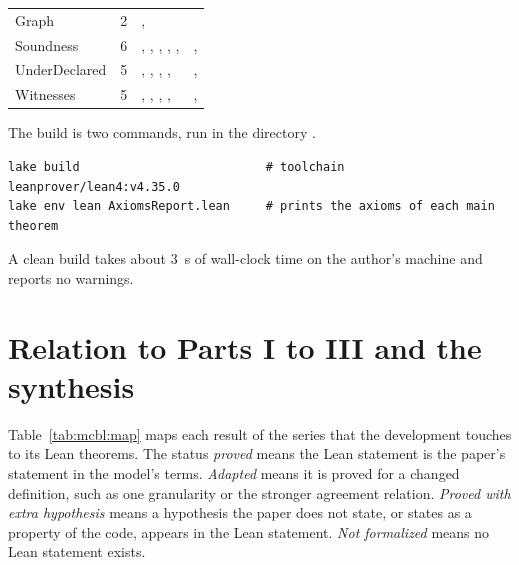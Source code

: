 \documentclass[11pt,letterpaper]{article}
\theoremstyle{definition}
\theoremstyle{remark}
\begin{document}
\begin{small}
\begin{longtable}{@{}L{2.3cm}L{1.0cm}L{8.7cm}L{2.4cm}@{}}
Graph & 2 & ,  &  \\
Soundness & 6 & , , , , ,  & ,  \\
UnderDeclared & 5 & , , , ,  & ,  \\
Witnesses & 5 & , , , ,  & ,  \\
\end{longtable}
\end{small}

The build is two commands, run in the directory .
\begin{lstlisting}[language={},caption={Building the development and printing the axioms report},label={lst:mcbl:build}]
lake build                          # toolchain leanprover/lean4:v4.35.0
lake env lean AxiomsReport.lean     # prints the axioms of each main theorem
\end{lstlisting}
A clean build takes about 3~s of wall-clock time on the author's machine and reports no warnings.

\section{Relation to Parts I to III and the synthesis}
\label{sec:mcbl:relation}

Table~\ref{tab:mcbl:map} maps each result of the series that the development touches to its Lean theorems. The status \emph{proved} means the Lean statement is the paper's statement in the model's terms. \emph{Adapted} means it is proved for a changed definition, such as one granularity or the stronger agreement relation. \emph{Proved with extra hypothesis} means a hypothesis the paper does not state, or states as a property of the code, appears in the Lean statement. \emph{Not formalized} means no Lean statement exists.
\end{document}
